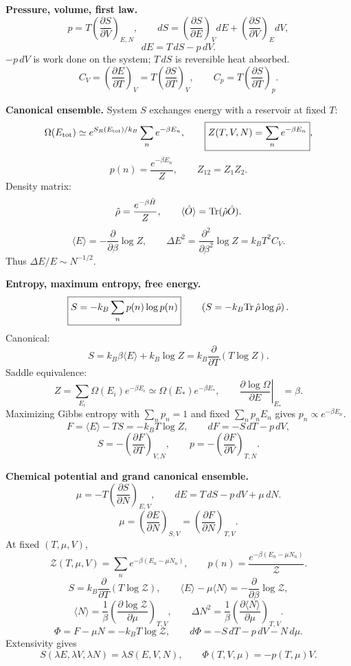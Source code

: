 \noindent\textbf{Pressure, volume, first law.}\quad
\[
\boxed{p=T\left(\frac{\partial S}{\partial V}\right)_{E,N}},
\qquad
dS=\left(\frac{\partial S}{\partial E}\right)_VdE
+\left(\frac{\partial S}{\partial V}\right)_EdV,
\]
\[
\boxed{dE=T\,dS-p\,dV}.
\]
$-p\,dV$ is work done on the system; $T\,dS$ is reversible heat absorbed.
\[
\boxed{C_V=\left(\frac{\partial E}{\partial T}\right)_V
=T\left(\frac{\partial S}{\partial T}\right)_V},
\qquad
C_p=T\left(\frac{\partial S}{\partial T}\right)_p.
\]

\noindent\textbf{Canonical ensemble.}\quad
System $S$ exchanges energy with a reservoir at fixed $T$:
\[
\Omega(E_{\rm tot})\simeq e^{S_R(E_{\rm tot})/k_B}
\sum_n e^{-\beta E_n},
\qquad
\boxed{Z(T,V,N)=\sum_n e^{-\beta E_n}},
\]
\[
\boxed{p(n)=\frac{e^{-\beta E_n}}{Z}},
\qquad
Z_{12}=Z_1Z_2.
\]
Density matrix:
\[
\hat\rho=\frac{e^{-\beta\hat H}}{Z},
\qquad
\langle\hat O\rangle={\rm Tr}(\hat\rho\hat O).
\]
\[
\boxed{\langle E\rangle=-\frac{\partial}{\partial\beta}\log Z},
\qquad
\boxed{\Delta E^2=
\frac{\partial^2}{\partial\beta^2}\log Z
=k_BT^2C_V}.
\]
Thus $\Delta E/E\sim N^{-1/2}$.

\noindent\textbf{Entropy, maximum entropy, free energy.}\quad
\[
\boxed{S=-k_B\sum_n p(n)\log p(n)}
\qquad
\left(S=-k_B{\rm Tr}\,\hat\rho\log\hat\rho\right).
\]
Canonical:
\[
S=k_B\beta\langle E\rangle+k_B\log Z
=\boxed{k_B\frac{\partial}{\partial T}\left(T\log Z\right)}.
\]
Saddle equivalence:
\[
Z=\sum_{E_i}\Omega(E_i)e^{-\beta E_i}
\simeq\Omega(E_*)e^{-\beta E_*},
\qquad
\left.\frac{\partial\log\Omega}{\partial E}\right|_{E_*}=\beta.
\]
Maximizing Gibbs entropy with $\sum_np_n=1$ and fixed $\sum_np_nE_n$
gives $p_n\propto e^{-\beta E_n}$.
\[
\boxed{F=\langle E\rangle-TS=-k_BT\log Z},
\qquad
\boxed{dF=-S\,dT-p\,dV},
\]
\[
\boxed{S=-\left(\frac{\partial F}{\partial T}\right)_{V,N}},
\qquad
\boxed{p=-\left(\frac{\partial F}{\partial V}\right)_{T,N}}.
\]

\noindent\textbf{Chemical potential and grand canonical ensemble.}\quad
\[
\boxed{\mu=-T\left(\frac{\partial S}{\partial N}\right)_{E,V}},
\qquad
\boxed{dE=T\,dS-p\,dV+\mu\,dN}.
\]
\[
\boxed{\mu=\left(\frac{\partial E}{\partial N}\right)_{S,V}
=\left(\frac{\partial F}{\partial N}\right)_{T,V}}.
\]
At fixed $(T,\mu,V)$,
\[
\boxed{\mathcal Z(T,\mu,V)=\sum_n e^{-\beta(E_n-\mu N_n)}},
\qquad
\boxed{p(n)=\frac{e^{-\beta(E_n-\mu N_n)}}{\mathcal Z}}.
\]
\[
\boxed{S=k_B\frac{\partial}{\partial T}\left(T\log\mathcal Z\right)},
\qquad
\boxed{\langle E\rangle-\mu\langle N\rangle
=-\frac{\partial}{\partial\beta}\log\mathcal Z},
\]
\[
\boxed{\langle N\rangle=\frac{1}{\beta}
\left(\frac{\partial\log\mathcal Z}{\partial\mu}\right)_{T,V}},
\qquad
\boxed{\Delta N^2=\frac{1}{\beta}
\left(\frac{\partial\langle N\rangle}{\partial\mu}\right)_{T,V}}.
\]
\[
\boxed{\Phi=F-\mu N=-k_BT\log\mathcal Z},
\qquad
\boxed{d\Phi=-S\,dT-p\,dV-N\,d\mu}.
\]
Extensivity gives
\[
S(\lambda E,\lambda V,\lambda N)=\lambda S(E,V,N),
\qquad
\boxed{\Phi(T,V,\mu)=-p(T,\mu)V}.
\]

